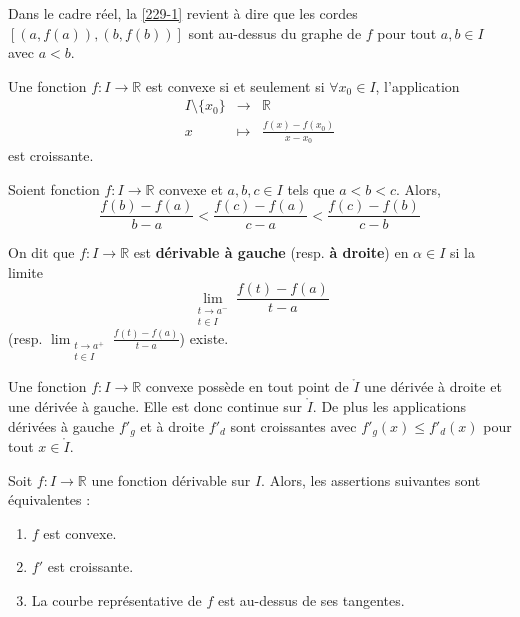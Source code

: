 
  \begin{remark}
    Dans le cadre réel, la \cref{229-1} revient à dire que les cordes $[(a, f(a)), (b, f(b))]$ sont au-dessus du graphe de $f$ pour tout $a, b \in I$ avec $a < b$.
  \end{remark}

  \begin{proposition}
    Une fonction $f : I \rightarrow \mathbb{R}$ est convexe si et seulement si $\forall x_0 \in I$, l'application
    \[
    \begin{array}{ccc}
      I \setminus \{ x_0 \} &\rightarrow& \mathbb{R} \\
      x &\mapsto& \frac{f(x) - f(x_0)}{x - x_0}
    \end{array}
    \]
    est croissante.
  \end{proposition}

  \begin{corollary}
    Soient fonction $f : I \rightarrow \mathbb{R}$ convexe et $a, b, c \in I$ tels que $a < b < c$. Alors,
    \[ \frac{f(b) - f(a)}{b-a} < \frac{f(c) - f(a)}{c-a} < \frac{f(c) - f(b)}{c-b} \]
  \end{corollary}


  \begin{definition}
    On dit que $f : I \rightarrow \mathbb{R}$ est \textbf{dérivable à gauche} (resp. \textbf{à droite}) en $\alpha \in I$ si la limite
    \[ \lim_{\substack{t \rightarrow a^{-} \\ t \in I}} \frac{f(t) - f(a)}{t-a} \]
    (resp. $\lim_{\substack{t \rightarrow a^{+} \\ t \in I}} \frac{f(t) - f(a)}{t-a}$) existe.
  \end{definition}


  \begin{proposition}
    Une fonction $f : I \rightarrow \mathbb{R}$ convexe possède en tout point de $\mathring{I}$ une dérivée à droite et une dérivée à gauche. Elle est donc continue sur $\mathring{I}$. De plus les applications dérivées à gauche $f'_g$ et à droite $f'_d$ sont croissantes avec $f'_g(x) \leq f'_d(x)$ pour tout $x \in \mathring{I}$.
  \end{proposition}

  \begin{theorem}
    Soit $f : I \rightarrow \mathbb{R}$ une fonction dérivable sur $I$. Alors, les assertions suivantes sont équivalentes :
    \begin{enumerate}[label=(\roman*)]
      \item $f$ est convexe.
      \item $f'$ est croissante.
      \item La courbe représentative de $f$ est au-dessus de ses tangentes.
    \end{enumerate}
  \end{theorem}

